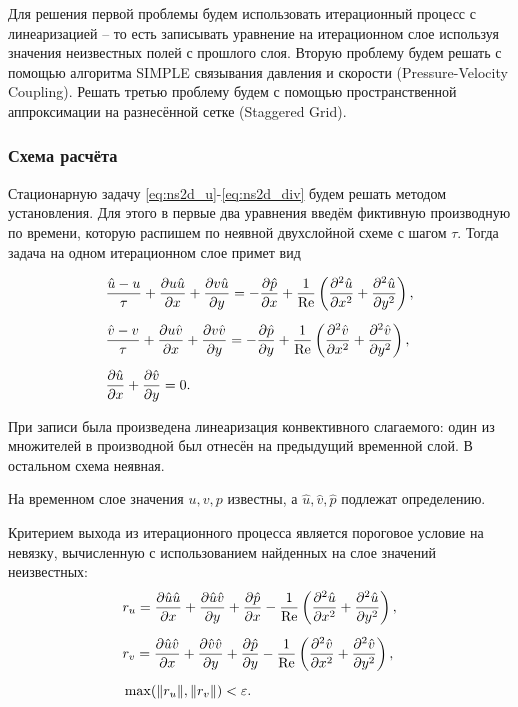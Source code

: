 Для решения первой проблемы будем использовать итерационный процесс с линеаризацией -- то есть
записывать уравнение на итерационном слое используя значения неизвестных полей с прошлого слоя.
Вторую проблему будем решать с помощью алгоритма SIMPLE
связывания давления и скорости (Pressure-Velocity Coupling).
Решать третью проблему будем с помощью пространственной аппроксимации на разнесённой сетке (Staggered Grid).

\subsubsection{Схема расчёта}

Стационарную задачу \eqref{eq:ns2d_u}-\eqref{eq:ns2d_div} будем решать
методом установления. Для этого в первые два уравнения введём фиктивную
производную по времени, которую распишем по неявной двухслойной схеме с шагом $\tau$.
Тогда задача на одном итерационном слое примет вид

\begin{align}
    \label{eq:ns2d_semi_u}
    & \frac{\hat u - u}{\tau} + \frac{\partial u \hat u}{\partial x} + \frac{\partial v \hat u}{\partial y} =
        -\frac{\partial \hat p}{\partial x}
        + \frac{1}{\mathrm{Re}}\left(\frac{\partial^2 \hat u}{\partial x^2} + \frac{\partial^2 \hat u}{\partial y^2}\right),\\[5pt]
    \label{eq:ns2d_semi_v}
    & \frac{\hat v - v}{\tau} + \frac{\partial u\hat v}{\partial x} + \frac{\partial v \hat v}{\partial y} =
        -\frac{\partial \hat p}{\partial y}
        + \frac{1}{\mathrm{Re}}\left(\frac{\partial^2 \hat v}{\partial x^2} + \frac{\partial^2 \hat v}{\partial y^2}\right), \\[5pt]
    \label{eq:ns2d_semi_div}
    &\frac{\partial \hat u}{\partial x} + \frac{\partial \hat v}{\partial y} = 0.
\end{align}

При записи была произведена линеаризация конвективного слагаемого:
один из множителей в производной был отнесён на предыдущий
временной слой. В остальном схема неявная.

На временном слое значения $u, v, p$
известны, а $\hat u, \hat v, \hat p$ подлежат определению.

Критерием выхода из итерационного процесса является пороговое условие на невязку,
вычисленную с использованием найденных на слое значений неизвестных:
\begin{align}
    \nonumber
    &r_u = \frac{\partial \hat u \hat u}{\partial x} + \frac{\partial \hat u \hat v}{\partial y}
        + \frac{\partial \hat p}{\partial x}
        - \frac{1}{\mathrm{Re}}\left(\frac{\partial^2 \hat u}{\partial x^2} + \frac{\partial^2 \hat u}{\partial y^2}\right),\\[5pt]
    \nonumber
    &r_v = \frac{\partial \hat u\hat v}{\partial x} + \frac{\partial \hat v \hat v}{\partial y}
        +\frac{\partial \hat p}{\partial y}
        - \frac{1}{\mathrm{Re}}\left(\frac{\partial^2 \hat v}{\partial x^2} + \frac{\partial^2 \hat v}{\partial y^2}\right), \\[5pt]
    \label{eq:ns2d_residual}
    &\max(\lVert r_u \rVert, \lVert r_v \rVert) < \varepsilon.
\end{align}

